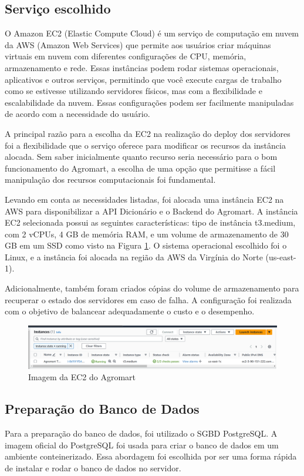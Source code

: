 \subsection{Serviço escolhido}
O Amazon EC2 (Elastic Compute Cloud) é um serviço de computação em nuvem da AWS (Amazon Web Services) que permite aos usuários criar máquinas virtuais em nuvem com diferentes configurações de CPU, memória, armazenamento e rede. Essas instâncias podem rodar sistemas operacionais, aplicativos e outros serviços, permitindo que você execute cargas de trabalho como se estivesse utilizando servidores físicos, mas com a flexibilidade e escalabilidade da nuvem. Essas configurações podem ser facilmente manipuladas de acordo com a necessidade do usuário.

A principal razão para a escolha da EC2 na realização do deploy dos servidores foi a flexibilidade que o serviço oferece para modificar os recursos da instância alocada. Sem saber inicialmente quanto recurso seria necessário para o bom funcionamento do Agromart, a escolha de uma opção que permitisse a fácil manipulação dos recursos computacionais foi fundamental.

Levando em conta as necessidades listadas, foi alocada uma instância EC2 na AWS para disponibilizar a API Dicionário e o Backend do Agromart. A instância EC2 selecionada possui as seguintes características: tipo de instância t3.medium, com 2 vCPUs, 4 GB de memória RAM, e um volume de armazenamento de 30 GB em um SSD como visto na Figura \ref{ec2}. O sistema operacional escolhido foi o Linux, e a instância foi alocada na região da AWS da Virgínia do Norte (us-east-1).

Adicionalmente, também foram criados cópias do volume de armazenamento para recuperar o estado dos servidores em caso de falha. A configuração foi realizada com o objetivo de balancear adequadamente o custo e o desempenho.

\begin{figure}[h]
        \centering
        \includegraphics[keepaspectratio=true,scale=0.3]{figuras/ec2_agromart.png}
        \caption{Imagem da EC2 do Agromart}
        \label{ec2}
\end{figure}

\subsection{Preparação do Banco de Dados}
Para a preparação do banco de dados, foi utilizado o SGBD PostgreSQL. A imagem oficial do PostgreSQL foi usada para criar o banco de dados em um ambiente conteinerizado. Essa abordagem foi escolhida por ser uma forma rápida de instalar e rodar o banco de dados no servidor.

